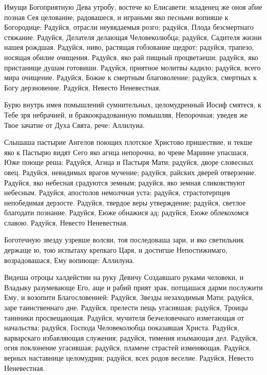 \begin{mymulticols}

Имущи Богоприятную Дева утробу, востече ко Елисавети: младенец же оноя абие познав Сея целование, радовашеся, и играньми яко песньми вопияше к Богородице: Радуйся, отрасли неувядаемыя розго; радуйся, Плода безсмертнаго стяжание. Радуйся, Делателя делающая Человеколюбца; радуйся, Садителя жизни нашея рождшая. Радуйся, ниво, растящая гобзование щедрот; радуйся, трапезо, носящая обилие очищения. Радуйся, яко рай пищный процветаеши; радуйся, яко пристанище душам готовиши. Радуйся, приятное молитвы кадило; радуйся, всего мира очищение. Радуйся, Божие к смертным благоволение; радуйся, смертных к Богу дерзновение. Радуйся, Невесто Неневестная.


Бурю внутрь имея помышлений сумнительных, целомудренный Иосиф смятеся, к Тебе зря небрачней, и бракоокрадованную помышляя, Непорочная; уведев же Твое зачатие от Духа Свята, рече: Аллилуиа.


Слышаша пастырие Ангелов поющих плотское Христово пришествие, и текше яко к Пастырю видят Сего яко агнца непорочна, во чреве Мариине упасшася, Юже поюще реша: Радуйся, Агнца и Пастыря Мати; радуйся, дворе словесных овец. Радуйся, невидимых врагов мучение; радуйся, райских дверей отверзение. Радуйся, яко небесная срадуются земным; радуйся, яко земная сликовствуют небесным. Радуйся, апостолов немолчная уста; радуйся, страстотерпцев непобедимая дерзосте. Радуйся, твердое веры утверждение; радуйся, светлое благодати познание. Радуйся, Еюже обнажися ад; радуйся, Еюже облекохомся славою. Радуйся, Невесто Неневестная.


Боготечную звезду узревше волсви, тоя последоваша зари, и яко светильник держаще ю, тою испытаху крепкаго Царя, и достигше Непостижимаго, возрадовашася, Ему вопиюще: Аллилуиа.


Видеша отроцы халдейстии на руку Девичу Создавшаго руками человеки, и Владыку разумевающе Его, аще и рабий прият зрак, потщашася дарми послужити Ему, и возопити Благословенней: Радуйся, Звезды незаходимыя Мати; радуйся, заре таинственнаго дне. Радуйся, прелести пещь угасившая; радуйся, Троицы таинники просвещающая. Радуйся, мучителя безчеловечнаго изметающая от начальства; радуйся, Господа Человеколюбца показавшая Христа. Радуйся, варварскаго избавляющая служения; радуйся, тимения изымающая дел. Радуйся, огня поклонение угасившая; радуйся, пламене страстей изменяющая. Радуйся, верных наставнице целомудрия; радуйся, всех родов веселие. Радуйся, Невесто Неневестная.


\end{mymulticols}
